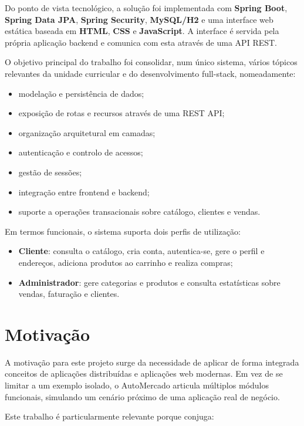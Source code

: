 \documentclass[10pt,a4paper]{report}
\begin{document}
Do ponto de vista tecnológico, a solução foi implementada com \textbf{Spring Boot}, \textbf{Spring Data JPA}, \textbf{Spring Security}, \textbf{MySQL/H2} e uma interface web estática baseada em \textbf{HTML}, \textbf{CSS} e \textbf{JavaScript}. A interface é servida pela própria aplicação backend e comunica com esta através de uma \ac{API} \ac{REST}.

O objetivo principal do trabalho foi consolidar, num único sistema, vários tópicos relevantes da unidade curricular e do desenvolvimento full-stack, nomeadamente:

\begin{itemize}
    \item modelação e persistência de dados;
    \item exposição de rotas e recursos através de uma \ac{REST} API;
    \item organização arquitetural em camadas;
    \item autenticação e controlo de acessos;
    \item gestão de sessões;
    \item integração entre frontend e backend;
    \item suporte a operações transacionais sobre catálogo, clientes e vendas.
\end{itemize}

Em termos funcionais, o sistema suporta dois perfis de utilização:

\begin{itemize}
    \item \textbf{Cliente}: consulta o catálogo, cria conta, autentica-se, gere o perfil e endereços, adiciona produtos ao carrinho e realiza compras;
    \item \textbf{Administrador}: gere categorias e produtos e consulta estatísticas sobre vendas, faturação e clientes.
\end{itemize}

\section{Motivação}

A motivação para este projeto surge da necessidade de aplicar de forma integrada conceitos de aplicações distribuídas e aplicações web modernas. Em vez de se limitar a um exemplo isolado, o AutoMercado articula múltiplos módulos funcionais, simulando um cenário próximo de uma aplicação real de negócio.

Este trabalho é particularmente relevante porque conjuga:
\end{document}
